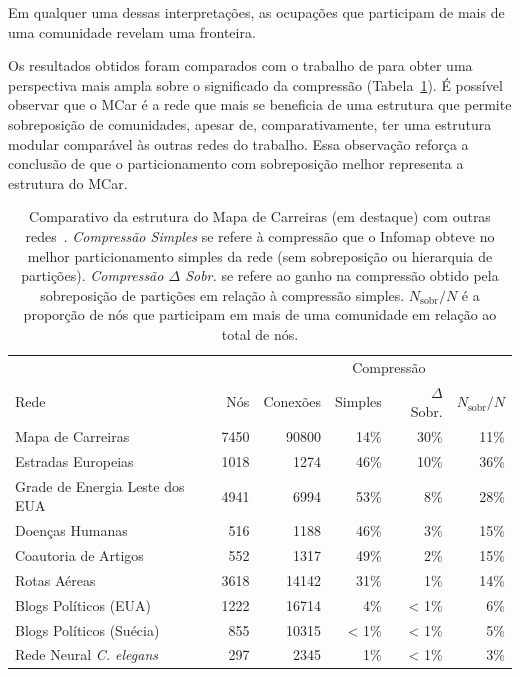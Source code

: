\documentclass[
  article,
  11pt,
  a4paper,
  english,
  brazil,
  sumario=tradicional]{abntex2}
\begin{document}
Em qualquer uma dessas interpretações, as ocupações que participam de mais de uma comunidade revelam uma fronteira.

Os resultados obtidos foram comparados com o trabalho de  para obter uma perspectiva mais ampla sobre o significado da compressão (Tabela~\ref{tab:comparativo}). É possível observar que o MCar é a rede que mais se beneficia de uma estrutura que permite sobreposição de comunidades, apesar de, comparativamente, ter uma estrutura modular comparável às outras redes do trabalho. Essa observação reforça a conclusão de que o particionamento com sobreposição melhor representa a estrutura do MCar.

\begin{table}
  \centering
  \begin{tabular}{@{} l r r r r r @{}}
    \toprule
                                           &      &          & \multicolumn{2}{c}{Compressão} & \\
    \cmidrule(r){4-5}
    Rede                                   & Nós  & Conexões & Simples & $\Delta$ Sobr.       & $N_{\text{sobr}}/N$ \\
    \midrule
    \rowcolor{yellow!25} Mapa de Carreiras & 7450 & 90800    & 14\%    & 30\%                 & 11\% \\
    Estradas Europeias                     & 1018 & 1274     & 46\%    & 10\%                 & 36\% \\
    Grade de Energia Leste dos EUA         & 4941 & 6994     & 53\%    & 8\%                  & 28\% \\
    Doenças Humanas                        & 516  & 1188     & 46\%    & 3\%                  & 15\% \\
    Coautoria de Artigos                   & 552  & 1317     & 49\%    & 2\%                  & 15\% \\
    Rotas Aéreas                           & 3618 & 14142    & 31\%    & 1\%                  & 14\% \\
    Blogs Políticos (EUA)                  & 1222 & 16714    & 4\%     & < 1\%                & 6\% \\
    Blogs Políticos (Suécia)               & 855  & 10315    & < 1\%   & < 1\%                & 5\% \\
    Rede Neural \textit{C. elegans}        & 297  & 2345     & 1\%     & < 1\%                & 3\% \\
    \bottomrule
  \end{tabular}
  \caption{Comparativo da estrutura do Mapa de Carreiras (em destaque) com outras redes~\cite{Viamontes_Esquivel2011-it}. \textit{Compressão Simples} se refere à compressão que o Infomap obteve no melhor particionamento simples da rede (sem sobreposição ou hierarquia de partições). \textit{Compressão $\Delta$ Sobr.} se refere ao ganho na compressão obtido pela sobreposição de partições em relação à compressão simples. $N_{\text{sobr}}/N$ é a proporção de nós que participam em mais de uma comunidade em relação ao total de nós.}
  \label{tab:comparativo}
\end{table}
\end{document}
